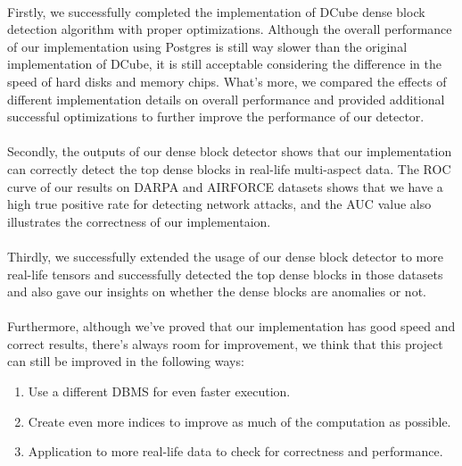 \paragraph{} Firstly, we successfully completed the implementation of DCube dense block detection algorithm with proper optimizations. Although the overall performance of our implementation
using Postgres is still way slower than the original implementation of DCube, it is still acceptable considering the difference in the speed of hard disks and memory chips. What's more,
we compared the effects of different implementation details on overall performance and provided additional successful optimizations to further improve the performance of our detector.
\paragraph{} Secondly, the outputs of our dense block detector shows that our implementation can correctly detect the top dense blocks in real-life multi-aspect data. The ROC curve of
our results on DARPA and AIRFORCE datasets shows that we have a high true positive rate for detecting network attacks, and the AUC value also illustrates the correctness of our implementaion.
\paragraph{} Thirdly, we successfully extended the usage of our dense block detector to more real-life tensors and successfully detected the top dense blocks in those datasets and also gave our
insights on whether the dense blocks are anomalies or not.
\paragraph{} Furthermore, although we've proved that our implementation has good speed and correct results, there's always room for improvement, we think that this project can still be
improved in the following ways:
\begin{enumerate}
\item Use a different DBMS for even faster execution.
\item Create even more indices to improve as much of the computation as possible.
\item Application to more real-life data to check for correctness and performance.
\end{enumerate}